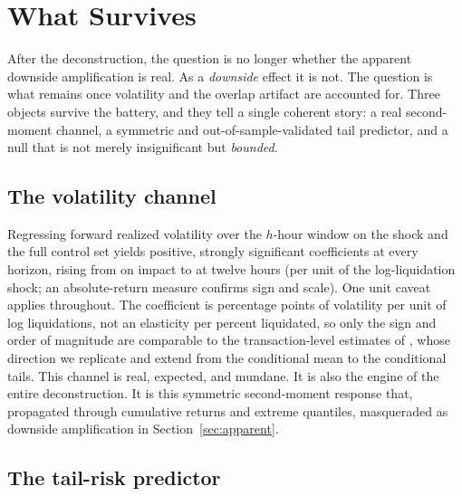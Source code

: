 \section{What Survives}
\label{sec:survives}

After the deconstruction, the question is no longer whether the apparent
downside amplification is real. As a \emph{downside} effect it is not. The
question is what remains once volatility and the overlap artifact are
accounted for. Three objects survive the battery, and they tell a single
coherent story: a real second-moment channel, a symmetric and
out-of-sample-validated tail predictor, and a null that is not merely
insignificant but \emph{bounded}.

\subsection{The volatility channel}
\label{sec:volchannel}

Regressing forward realized volatility over the $h$-hour window on the
shock and the full control set yields positive, strongly significant
coefficients at every horizon, rising from \VolRespHzero{} on impact to
\VolRespHtwelve{} at twelve hours (per unit of the log-liquidation shock;
an absolute-return measure confirms sign and scale). One unit caveat
applies throughout. The coefficient is percentage points of volatility per
unit of log liquidations, not an elasticity per percent liquidated, so only
the sign and order of magnitude are comparable to the transaction-level
estimates of \citet{oecd2023}, whose direction we replicate and extend from
the conditional mean to the conditional tails. This channel is real,
expected, and mundane. It is also the engine of the entire deconstruction.
It is this symmetric second-moment response that, propagated through
cumulative returns and extreme quantiles, masqueraded as downside
amplification in Section~\ref{sec:apparent}.

\subsection{The tail-risk predictor}
\label{sec:predictor}

